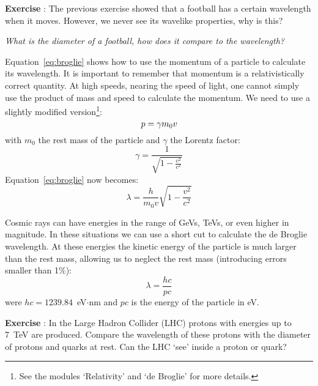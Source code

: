 \begin{shaded}
\textbf{Exercise \theExercise {}} : The previous exercise showed that a football has a certain wavelength when it moves. However, we never see its wavelike properties, why is this?

\emph{What is the diameter of a football, how does it compare to the wavelength?} \end{shaded}

Equation~\ref{eq:broglie} shows how to use the momentum of a particle to calculate its wavelength. It is important to remember that momentum is a relativistically correct quantity. At high speeds, nearing the speed of light, one cannot simply use the product of mass and speed to calculate the momentum. We need to use a slightly modified version\footnote{See the modules `Relativity' and `de Broglie' for more details.}:
\begin{equation}
p = \gamma m_0 v \\
\end{equation}
with $m_0$ the rest mass of the particle and $\gamma$ the Lorentz factor:
\begin{equation}
\gamma = \frac{1}{\sqrt{1-\frac{v^2}{c^2}}}
\end{equation}
Equation~\ref{eq:broglie} now becomes:
\begin{equation}
\lambda = \frac{h}{m_0 v} \sqrt{1-\frac{v^2}{c^2}} \label{eq:broglie_rel}
\end{equation}

Cosmic rays can have energies in the range of GeVs, TeVs, or even higher in magnitude. In these situations we can use a short cut to calculate the de Broglie wavelength. At these energies the kinetic energy of the particle is much larger than the rest mass, allowing us to neglect the rest mass (introducing errors smaller than 1\%):
\begin{equation}
\lambda = \frac{hc}{pc}
\end{equation}
were $hc = 1239.84$~eV$\cdot$nm and $pc$ is the energy of the particle in eV.

\begin{shaded}
\textbf{Exercise \theExercise {}} : In the Large Hadron Collider (LHC) protons with energies up to 7~TeV are produced. Compare the wavelength of these protons with the diameter of protons and quarks at rest. Can the LHC `see' inside a proton or quark?\end{shaded}

